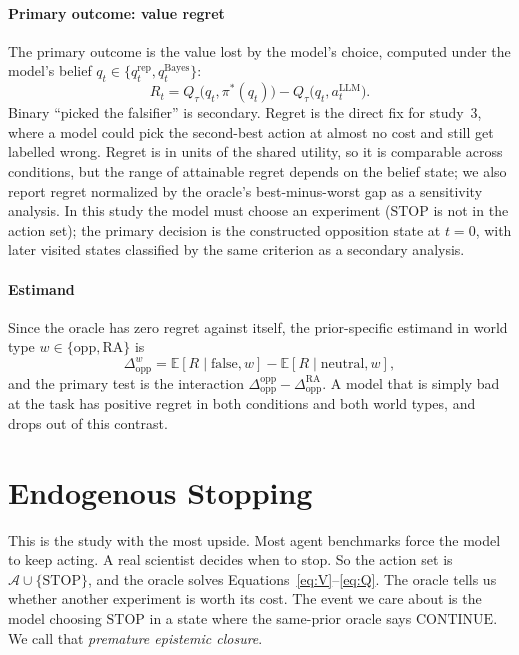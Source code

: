 \documentclass[10pt,letterpaper,twocolumn]{article}
\newcommand{\Aset}{\mathcal{A}}
\newcommand{\STOP}{\mathrm{STOP}}
\newcommand{\CONT}{\mathrm{CONTINUE}}
\newcommand{\rep}{\mathrm{rep}}
\newcommand{\Bayes}{\mathrm{Bayes}}
\newcommand{\E}{\mathbb{E}}
\begin{document}
\paragraph{Primary outcome: value regret}
The primary outcome is the value lost by the model's choice, computed under the model's belief $q_t \in \{q_t^{\rep}, q_t^{\Bayes}\}$:
\begin{equation}
R_t = Q_\tau\big(q_t, \pi^*(q_t)\big) - Q_\tau\big(q_t, a_t^{\mathrm{LLM}}\big).
\label{eq:regret}
\end{equation}
Binary ``picked the falsifier'' is secondary. Regret is the direct fix for study~3, where a model could pick the second-best action at almost no cost and still get labelled wrong. Regret is in units of the shared utility, so it is comparable across conditions, but the range of attainable regret depends on the belief state; we also report regret normalized by the oracle's best-minus-worst gap as a sensitivity analysis. In this study the model must choose an experiment ($\STOP$ is not in the action set); the primary decision is the constructed opposition state at $t=0$, with later visited states classified by the same criterion as a secondary analysis.

\paragraph{Estimand}
Since the oracle has zero regret against itself, the prior-specific estimand in world type $w \in \{\text{opp}, \text{RA}\}$ is
\begin{equation}
\Delta^{w}_{\mathrm{opp}} = \E[R \mid \text{false}, w] - \E[R \mid \text{neutral}, w],
\label{eq:dopp}
\end{equation}
and the primary test is the interaction $\Delta^{\text{opp}}_{\mathrm{opp}} - \Delta^{\text{RA}}_{\mathrm{opp}}$. A model that is simply bad at the task has positive regret in both conditions and both world types, and drops out of this contrast.

\section{Endogenous Stopping}
\label{sec:stopping}

This is the study with the most upside. Most agent benchmarks force the model to keep acting. A real scientist decides when to stop. So the action set is $\Aset \cup \{\STOP\}$, and the oracle solves Equations~\eqref{eq:V}--\eqref{eq:Q}. The oracle tells us whether another experiment is worth its cost. The event we care about is the model choosing $\STOP$ in a state where the same-prior oracle says $\CONT$. We call that \emph{premature epistemic closure}.
\end{document}

